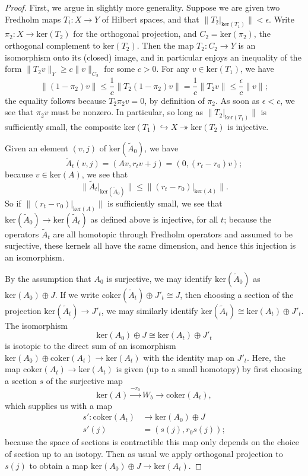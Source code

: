\documentclass{memo-l}
\theoremstyle{definition}
\theoremstyle{remark}
\numberwithin{section}{chapter}
\numberwithin{equation}{chapter}
\begin{document}
\begin{proof}First, we argue in slightly more generality. Suppose we are given two Fredholm maps $T_i: X \to Y$ of Hilbert spaces, and that $\|T_2\big|_{\text{ker}(T_1)}\| < \epsilon$. Write $\pi_2: X \to \text{ker}(T_2)$ for the orthogonal projection, and $C_2 = \text{ker}(\pi_2)$, the orthogonal complement to $\text{ker}(T_2)$. Then the map $T_2: C_2 \to Y$ is an isomorphism onto its (closed) image, and in particular enjoys an inequality of the form $\|T_2 v\|_Y \geq c\|v\|_{C_2}$ for some $c > 0$. For any $v \in \text{ker}(T_1)$, we have $$\|(1-\pi_2)v\| \leq \frac 1c \|T_2 (1-\pi_2)v\| = \frac 1c \|T_2 v\|\leq \frac{\epsilon}{c} \|v\|;$$ the equality follows because $T_2 \pi_2 v = 0$, by definition of $\pi_2$. As soon as $\epsilon < c$, we see that $\pi_2 v$ must be nonzero. In particular, so long as $\|T_2\big|_{\text{ker}(T_1)}\|$ is sufficiently small, the composite $\text{ker}(T_1) \hookrightarrow X \twoheadrightarrow \text{ker}(T_2)$ is injective.

Given an element $(v, j)$ of $\text{ker}(\widetilde A_0)$, we have $$\widetilde A_t(v,j) = (Av, r_t v + j) = (0, (r_t - r_0) v);$$ because $v \in \text{ker}(A)$, we see that $$\|\widetilde A_t\big|_{\text{ker}(\widetilde A_0)} \| \leq \|(r_t - r_0)\big|_{\text{ker}(A)}\|.$$ So if $\|(r_t - r_0)\big|_{\text{ker}(A)}\|$ is sufficiently small, we see that $\text{ker}(\widetilde A_0) \to \text{ker}(\widetilde A_t)$ as defined above is injective, for all $t$; because the operators $\widetilde A_t$ are all homotopic through Fredholm operators and assumed to be surjective, these kernels all have the same dimension, and hence this injection is an isomorphism.

By the assumption that $A_0$ is surjective, we may identify $\text{ker}(\widetilde A_0)$ as $\text{ker}(A_0) \oplus J$. If we write $\text{coker}(\widetilde A_t) \oplus J'_t \cong J$, then choosing a section of the projection $\text{ker}(\widetilde A_t) \to J'_t$, we may similarly identify $\text{ker}(\widetilde A_t) \cong \text{ker}(A_t) \oplus J'_t$. The isomorphism $$\text{ker}(A_0) \oplus J \cong \text{ker}(A_t) \oplus J'_t$$ is isotopic to the direct sum of an isomorphism $\text{ker}(A_0) \oplus \text{coker}(A_t) \to \text{ker}(A_t)$ with the identity map on $J'_t$. Here, the map $\text{coker}(A_t) \to \text{ker}(A_t)$ is given (up to a small homotopy) by first choosing a section $s$ of the surjective map 
$$\text{ker}(A) \xrightarrow{-r_0} W_b \to \text{coker}(A_t),$$ 
which supplies us with a map 
\begin{align*}s': \text{coker}(A_t) &\to \text{ker}(A_0) \oplus J\\ 
s'(j) &= (s(j), r_0 s(j));\end{align*}
because the space of sections is contractible this map only depends on the choice of section up to an isotopy. Then as usual we apply orthogonal projection to $s(j)$ to obtain a map $\text{ker}(A_0) \oplus J \to \text{ker}(A_t)$.


\end{proof}
\end{document}
